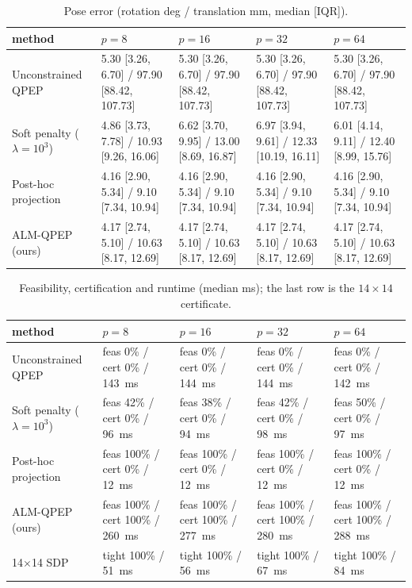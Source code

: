 \begin{table}[t]
\centering
\caption{Pose error (rotation deg / translation mm, median [IQR]).}
\label{tab:app_main_pose}
\scriptsize
\setlength{\tabcolsep}{2pt}
\begin{tabular}{@{}l*{4}{p{3.42cm}}@{}}
\toprule
method & $p=8$ & $p=16$ & $p=32$ & $p=64$ \\
\midrule
Unconstrained QPEP & 5.30 [3.26, 6.70] / 97.90 [88.42, 107.73] & 5.30 [3.26, 6.70] / 97.90 [88.42, 107.73] & 5.30 [3.26, 6.70] / 97.90 [88.42, 107.73] & 5.30 [3.26, 6.70] / 97.90 [88.42, 107.73] \\
Soft penalty ($\lambda{=}10^3$) & 4.86 [3.73, 7.78] / 10.93 [9.26, 16.06] & 6.62 [3.70, 9.95] / 13.00 [8.69, 16.87] & 6.97 [3.94, 9.61] / 12.33 [10.19, 16.11] & 6.01 [4.14, 9.11] / 12.40 [8.99, 15.76] \\
Post-hoc projection & 4.16 [2.90, 5.34] / 9.10 [7.34, 10.94] & 4.16 [2.90, 5.34] / 9.10 [7.34, 10.94] & 4.16 [2.90, 5.34] / 9.10 [7.34, 10.94] & 4.16 [2.90, 5.34] / 9.10 [7.34, 10.94] \\
ALM-QPEP (ours) & 4.17 [2.74, 5.10] / 10.63 [8.17, 12.69] & 4.17 [2.74, 5.10] / 10.63 [8.17, 12.69] & 4.17 [2.74, 5.10] / 10.63 [8.17, 12.69] & 4.17 [2.74, 5.10] / 10.63 [8.17, 12.69] \\
\bottomrule
\end{tabular}

\end{table}

\begin{table}[t]
\centering
\caption{Feasibility, certification and runtime (median ms); the last row is the $14\times14$ certificate.}
\label{tab:app_main_rates}
\scriptsize
\setlength{\tabcolsep}{3pt}
\begin{tabular}{@{}l*{4}{p{3.15cm}}@{}}
\toprule
method & $p=8$ & $p=16$ & $p=32$ & $p=64$ \\
\midrule
Unconstrained QPEP & feas 0\% / cert 0\% / 143~ms & feas 0\% / cert 0\% / 144~ms & feas 0\% / cert 0\% / 144~ms & feas 0\% / cert 0\% / 142~ms \\
Soft penalty ($\lambda{=}10^3$) & feas 42\% / cert 0\% / 96~ms & feas 38\% / cert 0\% / 94~ms & feas 42\% / cert 0\% / 98~ms & feas 50\% / cert 0\% / 97~ms \\
Post-hoc projection & feas 100\% / cert 0\% / 12~ms & feas 100\% / cert 0\% / 12~ms & feas 100\% / cert 0\% / 12~ms & feas 100\% / cert 0\% / 12~ms \\
ALM-QPEP (ours) & feas 100\% / cert 100\% / 260~ms & feas 100\% / cert 100\% / 277~ms & feas 100\% / cert 100\% / 280~ms & feas 100\% / cert 100\% / 288~ms \\
14$\times$14 SDP & tight 100\% / 51~ms & tight 100\% / 56~ms & tight 100\% / 67~ms & tight 100\% / 84~ms \\
\bottomrule
\end{tabular}

\end{table}

